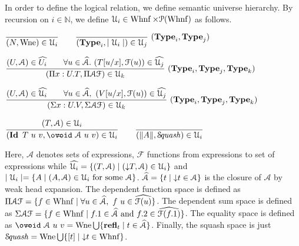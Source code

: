 \documentclass[a4paper,english]{lipics-utf8x}
\begin{document}

  In order to define the logical relation, we define semantic universe
  hierarchy.
  By recursion on $i \in \mathbb{N}$, we define
  $\mathcal{U}_i \in \operatorname{Whnf} \times \mathcal{P}(\operatorname{Whnf})$ as follows.

  \begin{center}
  \(
    \ru{}{(N, \Wne) \in \U_i}
    \qquad
    \rux{}{(\Type_i, \mid \U_i \mid) \in \U_j}{(\Type_i,\Type_j)}
  \)
  \end{center}

  \begin{center}
  \(
    \rux{(U, \mathcal{A}) \in \widehat{U_i} \qquad
         \forall u \in \widehat{\mathcal{A}}.\ (T[u/x],\mathcal{F}(u)) \in
         \widehat{\U_j}
       }{(\Pi x:U.T, \Pi \mathcal{A} \mathcal{F}) \in \U_k
       }{(\Type_i, \Type_j, \Type_k)}
  \)
  \end{center}

  \begin{center}
  \(
    \rux{(U, \mathcal{A}) \in \widehat{\U_i} \qquad
        \forall u \in \widehat{\mathcal{A}},\ (V[u/x], \mathcal{F}(u)) \in
        \widehat{\U_j}
       }{(\Sigma x:U.V, \Sigma \mathcal{A} \mathcal{F}) \in \U_k
       }{(\Type_i, \Type_j, \Type_k)}
  \)
  \end{center}

  \begin{center}
  \(
    \ru{(T,\mathcal{A}) \in \U_i
      }{(\Id T\ u\ v, \oeq\ \mathcal{A}\ u\ v) \in \U_i}
    \qquad
    \ru{}{(\squash{A}, \Squash) \in \U_i}
  \)
  \end{center}

  \noindent %
  Here, $\mathcal{A}$ denotes sets of expressions, $\mathcal{F}$ functions from
  expressions to set of expressions while
  $\widehat{\mathcal{U}_i} = \{ (T,\mathcal{A}) \mid ({\downarrow} T, \mathcal{A}) \in \mathcal{U}_i \}$
  and $\mid \mathcal{U}_i \mid = \{ A \mid (A, \mathcal{A}) \in \mathcal{U}_i \text{ for some }
  \mathcal{A} \}$.
  $\widehat{\mathcal{A}} = \{ t \mid {\downarrow} t \in \mathcal{A} \}$ is the closure
  of $\mathcal{A}$ by weak head expansion.
  The dependent function space is defined as
  $\Pi \mathcal{A} \mathcal{F} = \{ f \in \operatorname{Whnf} \mid \forall u \in
  \widehat{\mathcal{A}},\ f~u \in \widehat{\mathcal{F}(u)} \}$.
  The dependent sum space is defined as
  $\Sigma \mathcal{A} \mathcal{F} = \{ f \in \operatorname{Whnf} \mid f.1 \in
  \widehat{\mathcal{A}} \text{ and } f.2 \in \widehat{\mathcal{F}(f.1)} \}$.
  The equality space is defined as
  $\oeq\ \mathcal{A}\ u\ v = \Wne \bigcup \{ \refl_t \mid t \in
  \widehat{\mathcal{A}} \}$.
  Finally, the squash space is just
  $\operatorname{\mathcal{S}\!\mathit{quash}} = \operatorname{Wne} \bigcup \{ [t] \mid {\downarrow} t \in \operatorname{Whnf} \}$.
\end{document}
